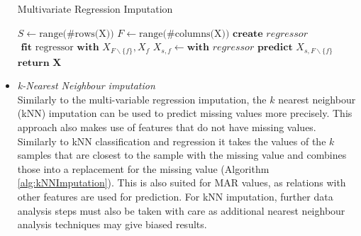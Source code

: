 \documentclass[10pt,a4paper]{article}
\begin{document}
\begin{itemize}
		\begin{algorithm}[H]
			\caption{Multivariate Regression Imputation}\label{alg:RegressionImputation}
			\begin{algorithmic}[1]
				\State $S \gets \text{range(\#rows(X))}$ 	
				\State $F \gets \text{range(\#columns(X))}$ 	
				 					
				 				 			
				\State $\textbf{create } \textit{regressor}$	
				\State $\textbf{ fit } \text{regressor} \textbf{ with } X_{F \backslash\{f\}}, X_f$	
				 
				 
				\State $X_{s,f} \gets \textbf{with }\textit{regressor} \textbf{ predict } X_{s, F \backslash \{f\}}$ 
				\EndIf
				\EndFor
				\EndIf
				\EndFor
				\State $\textbf{return X}$
				\EndProcedure
			\end{algorithmic}
		\end{algorithm}	
		
		\item \textit{k-Nearest Neighbour imputation} \\
		Similarly to the multi-variable regression imputation, the $k$ nearest neighbour (kNN) imputation can be used to predict missing values more precisely. This approach also makes use of features that do not have missing values. Similarly to kNN classification and regression it takes the values of the $k$ samples that are closest to the sample with the missing value and combines those into a replacement for the missing value (Algorithm \ref{alg:kNNImputation}). This is also suited for MAR values, as relations with other features are used for prediction\cite{myrtveit2001analyzing, cartwright2003dealing}. For kNN imputation, further data analysis steps must also be taken with care as additional nearest neighbour analysis techniques may give biased results\cite{donders2006gentle}.
		

\end{itemize}
\end{document}

